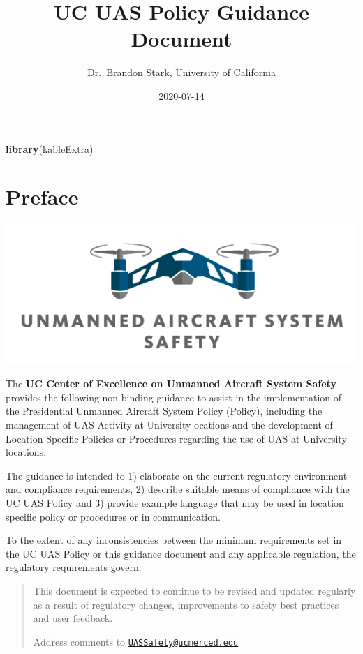 \documentclass[
]{book}
\title{UC UAS Policy Guidance Document}
\author{Dr.~Brandon Stark, University of California}
\date{2020-07-14}
\newenvironment{Shaded}{\begin{snugshade}}{\end{snugshade}}
\newcommand{\KeywordTok}[1]{\textcolor[rgb]{0.13,0.29,0.53}{\textbf{#1}}}
\newcommand{\NormalTok}[1]{#1}
\begin{document}
\maketitle

{
\setcounter{tocdepth}{1}
\tableofcontents
}
\begin{Shaded}
\begin{Highlighting}[]
\KeywordTok{library}\NormalTok{(kableExtra)}
\end{Highlighting}
\end{Shaded}

\hypertarget{preface}{%
\chapter*{Preface}\label{preface}}

\begin{center}\includegraphics[width=0.5\linewidth]{images/COE_logo} \end{center}

The \textbf{UC Center of Excellence on Unmanned Aircraft System Safety} provides the following non-binding guidance to assist in the implementation of the Presidential Unmanned Aircraft System Policy (Policy), including the management of UAS Activity at University ocations and the development of Location Specific Policies or Procedures regarding the use of UAS at University locations.

The guidance is intended to 1) elaborate on the current regulatory environment and compliance requirements, 2) describe suitable means of compliance with the UC UAS Policy and 3) provide example language that may be used in location specific policy or procedures or in communication.

To the extent of any inconsistencies between the minimum requirements set in the UC UAS Policy or this guidance document and any applicable regulation, the regulatory requirements govern.

\begin{quote}
This document is expected to continue to be revised and updated regularly as a result of regulatory changes, improvements to safety best practices and user feedback.

Address comments to \href{mailto:UASSafety@ucmerced.edu}{\nolinkurl{UASSafety@ucmerced.edu}}
\end{quote}
\end{document}
